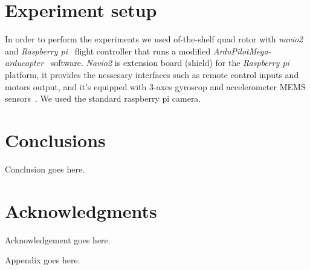 \documentclass{sig-alternate-ipsn13}
\begin{document}
\section{Experiment setup}
\label{sec:Experiment setup}

In order to perform the experiments we used of-the-shelf quad rotor with \textit{navio2}~\cite{navio} and \textit{Raspberry pi}~\cite{raspberry} flight controller that runs a modified \textit{ArduPilotMega-arducopter}~\cite{APM} software.
\textit{Navio2} is extension board (shield) for the \textit{Raspberry pi}~\cite{raspberry} platform, it provides the nessesary interfaces such as remote control inputs and motors output, and it's equipped with 3-axes gyroscop and accelerometer MEMS sensors~\cite{MEMS}.
We used the standard raspberry pi camera. %



\section{Conclusions}
Conclusion goes here.


\section*{Acknowledgments}
Acknowledgement goes here.


%

%
%
\appendix

Appendix goes here.

\end{document}
